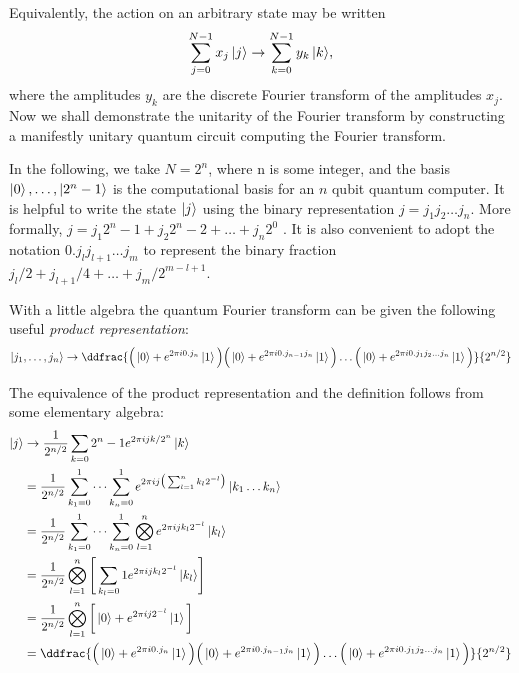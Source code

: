 Equivalently, the action on an arbitrary state may be written
$$\sum_{j=0}^{N-1}{x_j\ket{j}} \rightarrow \sum_{k=0}^{N-1}{y_k\ket{k}},$$
where the amplitudes $y_k$ are the discrete Fourier transform of the amplitudes $x_j$. Now we shall demonstrate the unitarity of the Fourier transform by constructing a manifestly unitary quantum circuit computing the Fourier transform.
\vspace{1em}

In the following, we take $N = 2^n$, where n is some integer, and the basis $\ket{0},\dots , \ket{2^n-1}$ is the computational basis for an $n$ qubit quantum computer. It is helpful to write the state $\ket{j}$ using the binary representation $j = j_1j_2\dots j_n$. More formally, $j = j_1 2^n−1 + j_2 2^n−2 + \dots + j_n 2^0$ . It is also convenient to adopt the notation $0.j_lj_{l+1}\dots j_m$ to represent the binary fraction $j_l/2 + j_{l+1}/4 + \dots + j_m/2^{m-l+1}$.
\vspace{1em}

With a little algebra the quantum Fourier transform can be given the following useful \textit{product representation}:
$$\ket{j_1,\dots,j_n} \rightarrow \ddfrac{\Big(\ket{0} + e^{2\pi i0.j_n}\ket{1}\Big)\Big(\ket{0} + e^{2\pi i0.j_{n-1}j_n}\ket{1}\Big)\dots\Big(\ket{0} + e^{2\pi i0.j_1j_2\dots j_n}\ket{1}\Big)}{2^{n/2}}$$

\newpage
The equivalence of the product representation and the definition follows from some elementary algebra:
\begin{equation*}
\begin{split}
    \ket{j} & \rightarrow \frac{1}{2^{n/2}}\sum_{k=0}{2^n-1}{e^{2\pi ijk/2^n}\ket{k}}\\
    & = \frac{1}{2^{n/2}} \sum_{k_1=0}^{1}\dots\sum_{k_n=0}^{1}{e^{2\pi ij\big(\sum_{l=1}^{n}{k_l2^{-l}}\big)}\ket{k_1\dots k_n}}\\
    & = \frac{1}{2^{n/2}} \sum_{k_1=0}^{1}\dots\sum_{k_n=0}^{1}{\bigotimes_{l=1}^{n}{e^{2\pi ijk_l2^{-l}}\ket{k_l}}}\\
    & = \frac{1}{2^{n/2}} \bigotimes_{l=1}^{n}{\Bigg[\sum_{k_l=0}{1}{e^{2\pi ijk_l2^{-l}}\ket{k_l}}\Bigg]}\\
    & = \frac{1}{2^{n/2}} \bigotimes_{l=1}^{n}{\bigg[\ket{0} + e^{2\pi ij2^{-l}}\ket{1}\bigg]}\\
    & = \ddfrac{\Big(\ket{0} + e^{2\pi i0.j_n}\ket{1}\Big)\Big(\ket{0} + e^{2\pi i0.j_{n-1}j_n}\ket{1}\Big)\dots\Big(\ket{0} + e^{2\pi i0.j_1j_2\dots j_n}\ket{1}\Big)}{2^{n/2}}
\end{split}
\end{equation*}

